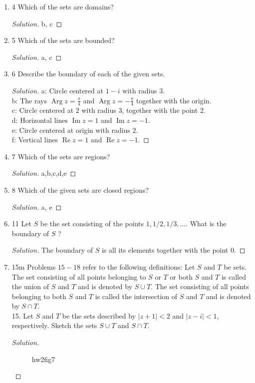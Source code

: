 \begin{enumerate}
\item 4 Which of the sets are domains?
\begin{proof}[Solution]
	b, c
\end{proof}

\item 5 Which of the sets are bounded?
\begin{proof}[Solution]
	a, c
\end{proof}

\item 6 Describe the boundary of each of the given sets.
\begin{proof}[Solution]
	a: Circle centered at $1-i$ with radius $3$.\\
	b: The rays $\operatorname{Arg} z = \frac{\pi}{4}$ and $\operatorname{Arg} z = -\frac{\pi}{4}$ together with the origin.\\
	c: Circle centered at $2$ with radius $3$, together with the point $2$.\\
	d: Horizontal lines $\operatorname{Im} z = 1$ and $\operatorname{Im} z = -1$.\\
	e: Circle centered at origin with radius $2$.\\
	f: Vertical lines $\operatorname{Re} z=1$ and $\operatorname{Re} z = -1$.
\end{proof}

\item 7 Which of the sets are regions?
\begin{proof}[Solution]
	a,b,c,d,e
\end{proof}

\item 8 Which of the given sets are closed regions?
\begin{proof}[Solution]
	a, e
\end{proof}

\item 11 Let $S$ be the set consisting of the points $1,1 / 2,1 / 3, \ldots .$ What is the boundary of $S$ ?
\begin{proof}[Solution]
	The boundary of $S$ is all its elements together with the point $0$.
\end{proof}

\item 15m Problems $15-18$ refer to the following definitions: Let $S$ and $T$ be sets. The set consisting of all points belonging to $S$ or $T$ or both $S$ and $T$ is called the union of $S$ and $T$ and is denoted by $S \cup T$. The set consisting of all points belonging to both $S$ and $T$ is called the intersection of $S$ and $T$ and is denoted by $S \cap T$. \\
15. Let $S$ and $T$ be the sets described by $|z+1|<2$ and $|z-i|<1$, respectively. Sketch the sets $S \cup T$ and $S \cap T$.
\begin{proof}[Solution]
\begin{figure}[H]
    \centering
    \caption{hw2fig7}
    \label{fig:hw2fig7}
\end{figure}
\end{proof}


\end{enumerate}

